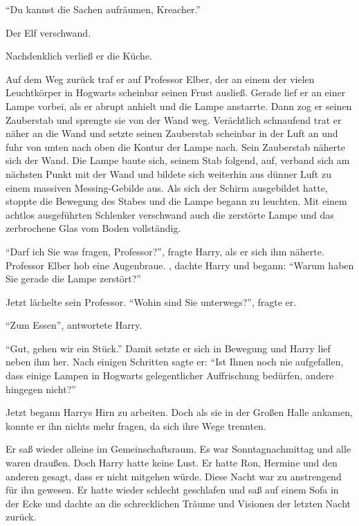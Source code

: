\enquote{Du kannst die Sachen aufräumen, Kreacher.}

Der Elf verschwand.

Nachdenklich verließ er die Küche. 

Auf dem Weg zurück traf er auf Professor Elber, der an einem der vielen Leuchtkörper in Hogwarts scheinbar seinen Frust ausließ. Gerade lief er an einer Lampe vorbei, als er abrupt anhielt und die Lampe anstarrte. Dann zog er seinen Zauberstab und sprengte sie von der Wand weg. Verächtlich schnaufend trat er näher an die Wand und setzte seinen Zauberstab scheinbar in der Luft an und fuhr von unten nach oben die Kontur der Lampe nach. Sein Zauberstab näherte sich der Wand. Die Lampe baute sich, seinem Stab folgend, auf, verband sich am nächsten Punkt mit der Wand und bildete sich weiterhin aus dünner Luft zu einem massiven Messing-Gebilde aus. Als sich der Schirm ausgebildet hatte, stoppte die Bewegung des Stabes und die Lampe begann zu leuchten. Mit einem achtlos ausgeführten Schlenker verschwand auch die zerstörte Lampe und das zerbrochene Glas vom Boden vollständig.

\enquote{Darf ich Sie was fragen, Professor?}, fragte Harry, als er sich ihm näherte. Professor Elber hob eine Augenbraue. , dachte Harry und begann: \enquote{Warum haben Sie gerade die Lampe zerstört?}

Jetzt lächelte sein Professor. \enquote{Wohin sind Sie unterwegs?}, fragte er.

\enquote{Zum Essen}, antwortete Harry.

\enquote{Gut, gehen wir ein Stück.} Damit setzte er sich in Bewegung und Harry lief neben ihm her. Nach einigen Schritten sagte er: \enquote{Ist Ihnen noch nie aufgefallen, dass einige Lampen in Hogwarts gelegentlicher Auffrischung bedürfen, andere hingegen nicht?}

Jetzt begann Harrys Hirn zu arbeiten. Doch als sie in der Großen Halle ankamen, konnte er ihn nichts mehr fragen, da sich ihre Wege trennten.

\trenn

Er saß wieder alleine im Gemeinschaftsraum. Es war Sonntagnachmittag und alle waren draußen. Doch Harry hatte keine Lust. Er hatte Ron, Hermine und den anderen gesagt, dass er nicht mitgehen würde. Diese Nacht war zu anstrengend für ihn gewesen. Er hatte wieder schlecht geschlafen und saß auf einem Sofa in der Ecke und dachte an die schrecklichen Träume und Visionen der letzten Nacht zurück.

